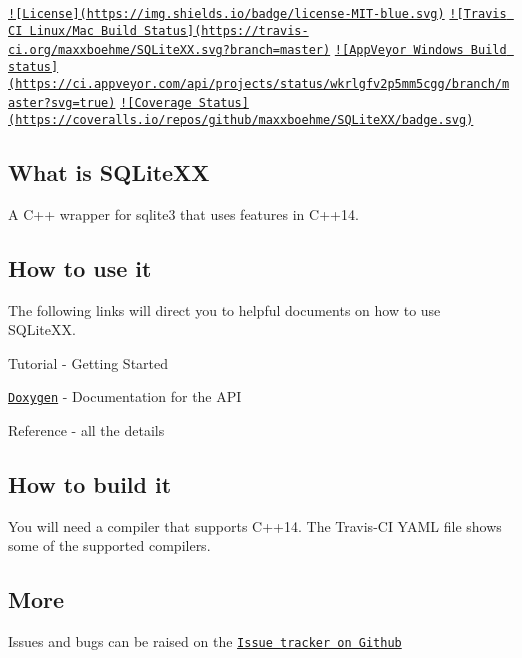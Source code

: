 \href{https://github.com/maxxboehme/SQLiteXX/blob/master/LICENSE.txt}{\tt !\mbox{[}License\mbox{]}(https\-://img.\-shields.\-io/badge/license-\/\-M\-I\-T-\/blue.\-svg)} \href{https://travis-ci.org/maxxboehme/SQLiteXX}{\tt !\mbox{[}Travis C\-I Linux/\-Mac Build Status\mbox{]}(https\-://travis-\/ci.\-org/maxxboehme/\-S\-Q\-Lite\-X\-X.\-svg?branch=master)} \href{https://ci.appveyor.com/project/maxxboehme/sqlitexx/branch/master}{\tt !\mbox{[}App\-Veyor Windows Build status\mbox{]}(https\-://ci.\-appveyor.\-com/api/projects/status/wkrlgfv2p5mm5cgg/branch/master?svg=true)} \href{https://coveralls.io/github/maxxboehme/SQLiteXX}{\tt !\mbox{[}Coverage Status\mbox{]}(https\-://coveralls.\-io/repos/github/maxxboehme/\-S\-Q\-Lite\-X\-X/badge.\-svg)}

\subsection*{What is S\-Q\-Lite\-X\-X}

A C++ wrapper for sqlite3 that uses features in C++14.

\subsection*{How to use it}

The following links will direct you to helpful documents on how to use S\-Q\-Lite\-X\-X.


\begin{DoxyItemize}
\item Tutorial -\/ Getting Started
\item \href{https://maxxboehme.github.io/SQLiteXX/doxygen/html}{\tt Doxygen} -\/ Documentation for the A\-P\-I
\item Reference -\/ all the details
\end{DoxyItemize}

\subsection*{How to build it}

You will need a compiler that supports C++14. The Travis-\/\-C\-I Y\-A\-M\-L file shows some of the supported compilers.

\subsection*{More}


\begin{DoxyItemize}
\item Issues and bugs can be raised on the \href{https://github.com/maxxboehme/SQLiteXX/issues}{\tt Issue tracker on Github} 
\end{DoxyItemize}